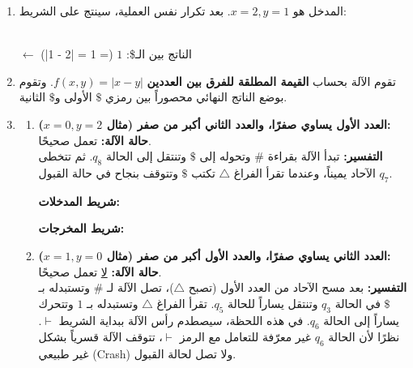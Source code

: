 \begin{boxSolution}
\begin{enumerate}[itemsep=1.5em, label=\alph*., resume]
\item
المدخل هو $x=2, y=1$. بعد تكرار نفس العملية، سينتج على الشريط:

\hfill
{}
\\
$\leftarrow$ الناتج بين الـ\$: $1$ (= 1 = |2 - 1|) \checkmark \\

\item
تقوم الآلة بحساب \textbf{القيمة المطلقة للفرق بين العددين} $f(x,y) = |x - y|$. وتقوم بوضع الناتج النهائي محصوراً بين رمزي $\$$ الأولى و$\$$ الثانية.

\item
\begin{enumerate}
    \item \textbf{العدد الأول يساوي صفرًا، والعدد الثاني أكبر من صفر (مثال $x=0, y=2$):} \\
    \textbf{حالة الآلة:} تعمل صحيحًا. \\
    \textbf{التفسير:} تبدأ الآلة بقراءة $\#$ وتحوله إلى $\$$ وتنتقل إلى الحالة $q_8$. ثم تتخطى الآحاد يميناً، وعندما تقرأ الفراغ $\triangle$ تكتب $\$$ وتتوقف بنجاح في حالة القبول $q_7$.

    {\small
    \textbf{شريط المدخلات:}
    \hfill

    \textbf{شريط المخرجات:}
    \hfill
    }

    \item \textbf{العدد الثاني يساوي صفرًا، والعدد الأول أكبر من صفر (مثال $x=1, y=0$):} \\
    \textbf{حالة الآلة:} \underline{لا} تعمل صحيحًا. \\
    \textbf{التفسير:} بعد مسح الآحاد من العدد الأول (تصبح $\triangle$)، تصل الآلة لـ $\#$ وتستبدله بـ $\$$ في الحالة $q_3$ وتنتقل يساراً للحالة $q_5$. تقرأ الفراغ $\triangle$ وتستبدله بـ $1$ وتتحرك يساراً إلى الحالة $q_6$. في هذه اللحظة، سيصطدم رأس الآلة ببداية الشريط $\vdash$. نظرًا لأن الحالة $q_6$ غير معرّفة للتعامل مع الرمز $\vdash$، تتوقف الآلة قسرياً بشكل غير طبيعي (Crash) ولا تصل لحالة القبول.


\end{enumerate}
\end{enumerate}
\end{boxSolution}
